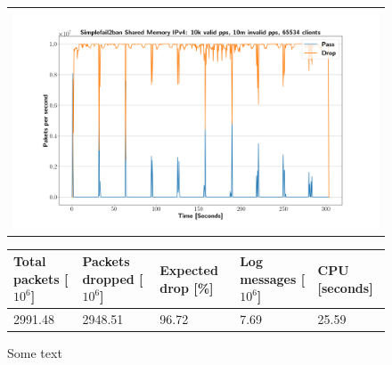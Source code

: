 \begin{figure}[p]
	\label{fig:simplefail2ban:shm:ip4:10m}
	\centering
	\scriptsize
	\begin{tabular}{c}
    	\centerline{\includegraphics[width=1.2\textwidth]{images/simplefail2ban_shm_ipv4_v10k_iv10m_c65534.png}}
	\end{tabular}
	\begin{tabular}{lllll}
		\toprule
		\textbf{Total packets [$10^6$]} & \textbf{Packets dropped [$10^6$]} & \textbf{Expected drop [\%]} & \textbf{Log messages [$10^6$]} & \textbf{CPU [seconds]} \\ \midrule 
		2991.48 & 2948.51 & 96.72 & 7.69 & 25.59 \\
		\bottomrule
	\end{tabular}
	\caption[Simplefail2ban Shared Memory IPv4 10m PPS]{Some text}
\end{figure}

